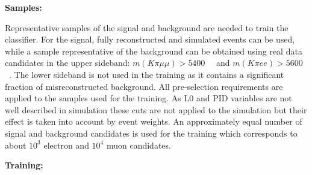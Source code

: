 {\bf Samples:}

Representative samples of the signal and background are needed to train the classifier.
For the signal, fully reconstructed \BdToKstmm and \BdKstee simulated events can be used,
while a sample representative of the background can be obtained using real data candidates
in the upper \Bz sideband: $m(K\pi\mu\mu) > 5400$~\mevcc~ and $m(K\pi ee) > 5600$~\mevcc.
The lower sideband is not used in the training as it contains a significant fraction of misreconstructed background.
All pre-selection requirements are applied to the samples used for the training.
As L0 and PID variables are not well described in simulation these cuts are not applied to the simulation
but their effect is taken into account by event weights.
An approximately equal number of signal and background candidates is used for the training
which corresponds to about $10^3$ electron and $10^4$ muon candidates.

{\bf Training:}

